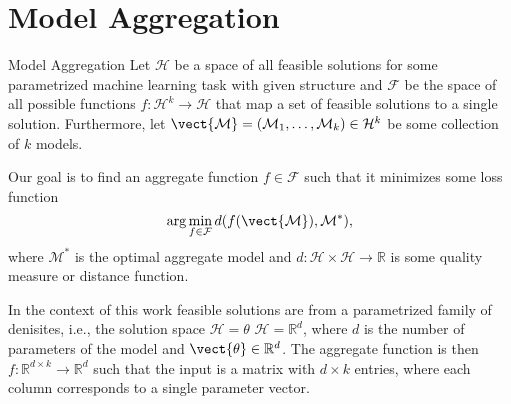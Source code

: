 
\chapter{Model Aggregation}
\label{chapter:ch3}

\begin{definition}[parbox=false]{Model Aggregation}
    Let $\mathcal{H}$ be a space of all feasible solutions for some parametrized machine learning task with given structure and $\mathcal{F}$ be the space of all possible functions $f: \mathcal{H}^k \rightarrow \mathcal{H}$ that map a set of feasible solutions to a single solution.
    Furthermore, let $\mathcal{\vect{M}} = (\mathcal{M}_1, \ldots, \mathcal{M}_k) \in \mathcal{H}^k$ be some collection of $k$ models.

    Our goal is to find an aggregate function $f \in \mathcal{F}$ such that it minimizes some loss function 
    \begin{equation}
        \arg\min_{f \in \mathcal{F}} d(f(\mathcal{\vect{M}}), \mathcal{M}^*),
    \end{equation}
    where $\mathcal{M}^*$ is the optimal aggregate model and $d: \mathcal{H} \times \mathcal{H} \rightarrow \mathbb{R}$ is some quality measure or distance function.
\end{definition}

In the context of this work feasible solutions are from a parametrized family of denisites, i.e., the solution space $\mathcal{H} = \theta$
$\mathcal{H} = \mathbb{R}^d$, where $d$ is the number of parameters of the model and $\vect{\theta} \in \mathbb{R}^d$.
The aggregate function is then $f: \mathbb{R}^{d \times k} \rightarrow \mathbb{R}^{d}$ such that the input is a matrix with $d \times k$ entries, where each column corresponds to a single parameter vector.

